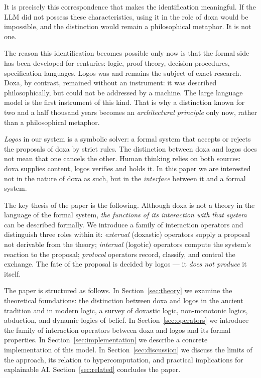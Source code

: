 \documentclass[12pt,a4paper]{article}
\begin{document}
It is precisely this correspondence that makes the identification meaningful.
If the LLM did not possess these characteristics, using it in the role of doxa
would be impossible, and the distinction would remain a philosophical metaphor.
It is not one.

The reason this identification becomes possible only now is that the formal
side has been developed for centuries: logic, proof theory, decision procedures,
specification languages. Logos was and remains the subject of exact research.
Doxa, by contrast, remained without an instrument: it was described
philosophically, but could not be addressed by a machine. The large language
model is the first instrument of this kind. That is why a distinction known for
two and a half thousand years becomes an \emph{architectural principle} only
now, rather than a philosophical metaphor.

\emph{Logos} in our system is a symbolic solver: a formal system that accepts
or rejects the proposals of doxa by strict rules. The distinction between doxa
and logos does not mean that one cancels the other. Human thinking relies on
both sources: doxa supplies content, logos verifies and holds it. In this paper
we are interested not in the nature of doxa as such, but in the
\emph{interface} between it and a formal system.

The key thesis of the paper is the following. Although doxa is not a theory in
the language of the formal system, \emph{the functions of its interaction with
that system} can be described formally. We introduce a family of interaction
operators and distinguish three roles within it: \emph{external} (doxastic)
operators supply a proposal not derivable from the theory; \emph{internal}
(logotic) operators compute the system's reaction to the proposal;
\emph{protocol} operators record, classify, and control the exchange. The fate
of the proposal is decided by logos --- it \emph{does not produce} it itself.

The paper is structured as follows. In Section~\ref{sec:theory} we examine the
theoretical foundations: the distinction between doxa and logos in the ancient
tradition and in modern logic, a survey of doxastic logic, non-monotonic
logics, abduction, and dynamic logics of belief. In
Section~\ref{sec:operators} we introduce the family of interaction operators
between doxa and logos and its formal properties. In
Section~\ref{sec:implementation} we describe a concrete implementation of this
model. In Section~\ref{sec:discussion} we discuss the limits of the approach,
its relation to hypercomputation, and practical implications for explainable
AI. Section~\ref{sec:related} concludes the paper.
\end{document}
